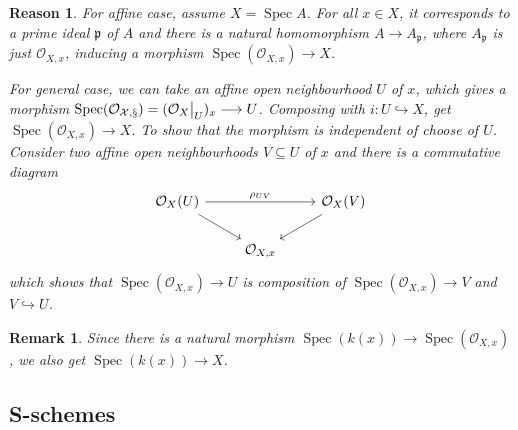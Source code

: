 \documentclass{ctexart}
\newtheorem{remark}{Remark}[section]
\newtheorem{reason}{Reason}[section]
\newcommand{\spec}{\operatorname{Spec}}
\begin{document}
\begin{reason}
    For affine case, assume $X = \spec A$.
    For all $x\in X$, it corresponds to a prime ideal $\mathfrak{p}$ of $A$ and there is a natural homomorphism $A \longrightarrow A_{\mathfrak{p}}$,
    where $A_{\mathfrak{p}}$ is just $\mathcal{O}_{X, x}$, inducing a morphism $\spec(\mathcal{O}_{X, x}) \longrightarrow X$.
    \par
    For general case, we can take an affine open neighbourhood $U$ of $x$, which gives a morphism $\spec(\mathcal{\mathcal{O}_{X, x}}) = (\mathcal{O}_{X}\big{|}_{U})_{x} \longrightarrow U$.
    Composing with $i: U \hookrightarrow X$, get $\spec(\mathcal{O}_{X, x}) \longrightarrow X$.
    To show that the morphism is independent of choose of $U$.
    Consider two affine open neighbourhoods $V \subseteq U$ of $x$ and there is a commutative diagram
    \begin{equation*}
        \begin{tikzcd}
            \mathcal{O}_{X}(U) \arrow[rr, "\rho_{UV}"] \arrow[dr] &&
            \mathcal{O}_{X}(V) \arrow[dl] \\
            & \mathcal{O}_{X,x} &
        \end{tikzcd}
    \end{equation*}
    which shows that $\spec(\mathcal{O}_{X, x}) \longrightarrow U$ is composition of $\spec(\mathcal{O}_{X, x}) \longrightarrow V$ and $V \hookrightarrow U$.
\end{reason}
\begin{remark}
    Since there is a natural morphism $\spec(k(x)) \longrightarrow \spec(\mathcal{O}_{X, x})$, we also get $\spec(k(x)) \longrightarrow X$.
\end{remark}

\subsection{S-schemes}
\label{subsection:Morphisms_of_Schemes_S-schemes}
\end{document}
